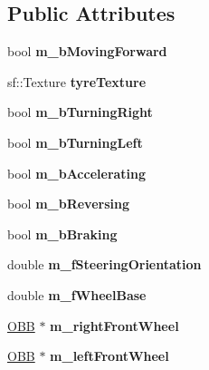 \subsection*{Public Attributes}
\begin{DoxyCompactItemize}
\item 
\hypertarget{class_car_a7f45340643c43ddd543d96662fe88911}{}bool {\bfseries m\+\_\+b\+Moving\+Forward}\label{class_car_a7f45340643c43ddd543d96662fe88911}

\item 
\hypertarget{class_car_a983d81f940c2a10f6b7657a27ad89a48}{}sf\+::\+Texture {\bfseries tyre\+Texture}\label{class_car_a983d81f940c2a10f6b7657a27ad89a48}

\item 
\hypertarget{class_car_a1caa04bed661507cc92dcc465374aa40}{}bool {\bfseries m\+\_\+b\+Turning\+Right}\label{class_car_a1caa04bed661507cc92dcc465374aa40}

\item 
\hypertarget{class_car_ab15cb88a73253d2d258368bed12be6cc}{}bool {\bfseries m\+\_\+b\+Turning\+Left}\label{class_car_ab15cb88a73253d2d258368bed12be6cc}

\item 
\hypertarget{class_car_a3ca299e37b7a2b964e68877e7fc41d56}{}bool {\bfseries m\+\_\+b\+Accelerating}\label{class_car_a3ca299e37b7a2b964e68877e7fc41d56}

\item 
\hypertarget{class_car_a8a5ba2979820d7c0f2a00571fd7755de}{}bool {\bfseries m\+\_\+b\+Reversing}\label{class_car_a8a5ba2979820d7c0f2a00571fd7755de}

\item 
\hypertarget{class_car_a0a5b2769f8000bc41da5ffacaff488bd}{}bool {\bfseries m\+\_\+b\+Braking}\label{class_car_a0a5b2769f8000bc41da5ffacaff488bd}

\item 
\hypertarget{class_car_af67de6d3bb5203272670314409bd3ca8}{}double {\bfseries m\+\_\+f\+Steering\+Orientation}\label{class_car_af67de6d3bb5203272670314409bd3ca8}

\item 
\hypertarget{class_car_a7be779b298ee9803e8189e08f0cafc27}{}double {\bfseries m\+\_\+f\+Wheel\+Base}\label{class_car_a7be779b298ee9803e8189e08f0cafc27}

\item 
\hypertarget{class_car_aeee6d1517b9a5e209c06a2bcd5ff4041}{}\hyperlink{class_o_b_b}{O\+B\+B} $\ast$ {\bfseries m\+\_\+right\+Front\+Wheel}\label{class_car_aeee6d1517b9a5e209c06a2bcd5ff4041}

\item 
\hypertarget{class_car_a2ab8adbfc7ae82ff7552acf47e75fd55}{}\hyperlink{class_o_b_b}{O\+B\+B} $\ast$ {\bfseries m\+\_\+left\+Front\+Wheel}\label{class_car_a2ab8adbfc7ae82ff7552acf47e75fd55}

\end{DoxyCompactItemize}
